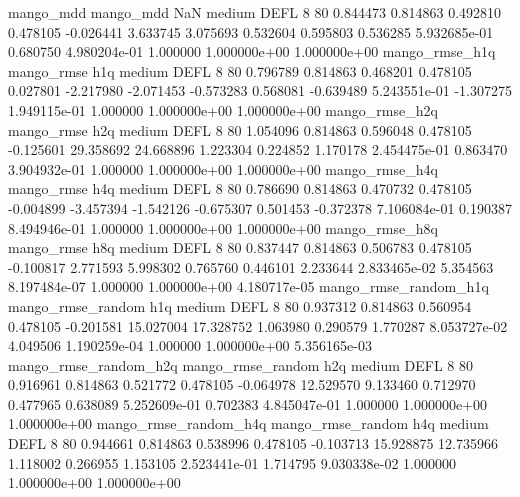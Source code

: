             mango_mdd         mango_mdd                  NaN     medium     DEFL                 8 80  0.844473       0.814863 0.492810       0.478105   -0.026441      3.633745      3.075693     0.532604       0.595803  0.536285 5.932685e-01     0.680750   4.980204e-01            1.000000    1.000000e+00        1.000000e+00
       mango_rmse_h1q        mango_rmse                  h1q     medium     DEFL                 8 80  0.796789       0.814863 0.468201       0.478105    0.027801     -2.217980     -2.071453    -0.573283       0.568081 -0.639489 5.243551e-01    -1.307275   1.949115e-01            1.000000    1.000000e+00        1.000000e+00
       mango_rmse_h2q        mango_rmse                  h2q     medium     DEFL                 8 80  1.054096       0.814863 0.596048       0.478105   -0.125601     29.358692     24.668896     1.223304       0.224852  1.170178 2.454475e-01     0.863470   3.904932e-01            1.000000    1.000000e+00        1.000000e+00
       mango_rmse_h4q        mango_rmse                  h4q     medium     DEFL                 8 80  0.786690       0.814863 0.470732       0.478105   -0.004899     -3.457394     -1.542126    -0.675307       0.501453 -0.372378 7.106084e-01     0.190387   8.494946e-01            1.000000    1.000000e+00        1.000000e+00
       mango_rmse_h8q        mango_rmse                  h8q     medium     DEFL                 8 80  0.837447       0.814863 0.506783       0.478105   -0.100817      2.771593      5.998302     0.765760       0.446101  2.233644 2.833465e-02     5.354563   8.197484e-07            1.000000    1.000000e+00        4.180717e-05
mango_rmse_random_h1q mango_rmse_random                  h1q     medium     DEFL                 8 80  0.937312       0.814863 0.560954       0.478105   -0.201581     15.027004     17.328752     1.063980       0.290579  1.770287 8.053727e-02     4.049506   1.190259e-04            1.000000    1.000000e+00        5.356165e-03
mango_rmse_random_h2q mango_rmse_random                  h2q     medium     DEFL                 8 80  0.916961       0.814863 0.521772       0.478105   -0.064978     12.529570      9.133460     0.712970       0.477965  0.638089 5.252609e-01     0.702383   4.845047e-01            1.000000    1.000000e+00        1.000000e+00
mango_rmse_random_h4q mango_rmse_random                  h4q     medium     DEFL                 8 80  0.944661       0.814863 0.538996       0.478105   -0.103713     15.928875     12.735966     1.118002       0.266955  1.153105 2.523441e-01     1.714795   9.030338e-02            1.000000    1.000000e+00        1.000000e+00
